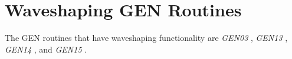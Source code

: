 \begin{comment}
\documentclass[10pt]{article}
\usepackage{fullpage, graphicx, url}
\setlength{\parskip}{1ex}
\setlength{\parindent}{0ex}
\title{Waveshaping GEN Routines}



\begin{tabular}{ccc}
The Alternative Csound Reference Manual & & \\
Previous &The Standard Numeric Score &Next

\end{tabular}

\end{comment}
\section{Waveshaping GEN Routines}


  The GEN routines that have waveshaping functionality are \emph{GEN03}
, \emph{GEN13}
, \emph{GEN14}
, and \emph{GEN15}
. 


\begin{comment}
\begin{tabular}{lcr}
Previous &Home &Next \\
Random Function GEN Routines &Up &Amplitude Scaling GEN Routines

\end{tabular}



\end{comment}
